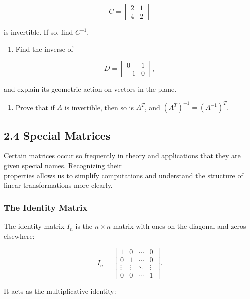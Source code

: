 \documentclass[
  12pt,
  a4paper,
]{article}
\begin{document}
\[C = \begin{bmatrix}
2 & 1 \\
4 & 2 \end{bmatrix}\]

is invertible. If so, find \(C^{-1}\).

\begin{enumerate}
\def\labelenumi{\arabic{enumi}.}
\item
  Find the inverse of
\end{enumerate}

\[D = \begin{bmatrix}
0 & 1 \\
-1 & 0 \end{bmatrix},\]

and explain its geometric action on vectors in the plane.

\begin{enumerate}
\def\labelenumi{\arabic{enumi}.}
\item
  Prove that if \(A\) is invertible, then so is \(A^T\), and
  \((A^T)^{-1} = (A^{-1})^T\).
\end{enumerate}

\subsection{2.4 Special Matrices}\label{24-special-matrices}

Certain matrices occur so frequently in theory and applications that
they are given special names. Recognizing their\\
properties allows us to simplify computations and understand the
structure of linear transformations more clearly.

\subsubsection{The Identity Matrix}\label{the-identity-matrix}

The identity matrix \(I_n\) is the \(n \times n\) matrix with ones on
the diagonal and zeros elsewhere:

\[I_n = \begin{bmatrix}
1 & 0 & \cdots & 0 \\
0 & 1 & \cdots & 0 \\
\vdots & \vdots & \ddots & \vdots \\
0 & 0 & \cdots & 1
\end{bmatrix}.\]

It acts as the multiplicative identity:
\end{document}
